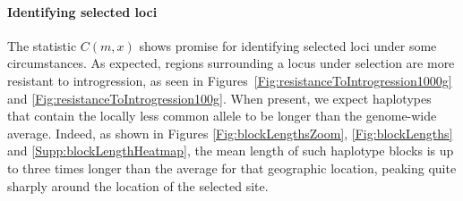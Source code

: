 \documentclass[11pt,letterpaper]{article}
\begin{document}
\paragraph{Identifying selected loci}
The statistic $C(m,x)$ shows promise for identifying selected loci under some circumstances.
As expected, regions surrounding a locus under selection are more resistant to introgression,
as seen in Figures~\ref{Fig:resistanceToIntrogression1000g} and \ref{Fig:resistanceToIntrogression100g}.
When present, we expect haplotypes that contain the locally less common allele
to be longer than the genome-wide average.
Indeed,
as shown in Figures \ref{Fig:blockLengthsZoom}, \ref{Fig:blockLengths} and \ref{Supp:blockLengthHeatmap},
the mean length of such haplotype blocks is up to three times longer
than the average for that geographic location,
peaking quite sharply around the location of the selected site.
\end{document}
